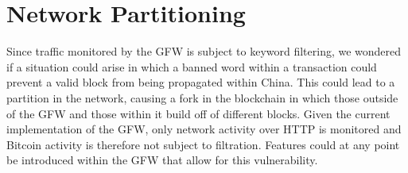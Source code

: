 \section{Network Partitioning}
Since traffic monitored by the GFW is subject to keyword filtering, we wondered if a situation could arise in which a banned word within a transaction could prevent a valid block from being propagated within China. This could lead to a partition in the network, causing a fork in the blockchain in which those outside of the GFW and those within it build off of different blocks. Given the current implementation of the GFW, only network activity over HTTP is monitored and Bitcoin activity is therefore not subject to filtration. Features could at any point be introduced within the GFW that allow for this vulnerability. 

